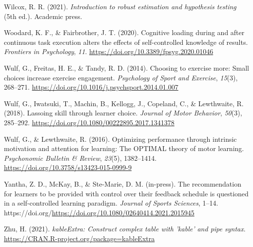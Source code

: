 \documentclass[
  doc, donotrepeattitle,floatsintext]{apa7}
\newlength{\cslhangindent}
\newlength{\cslentryspacingunit} %
\newenvironment{CSLReferences}[2] %
 {%
  \setlength{\parindent}{0pt}
  \ifodd #1
  \let\oldpar\par
  \def\par{\hangindent=\cslhangindent\oldpar}
  \fi
  \setlength{\parskip}{#2\cslentryspacingunit}
 }%
 {}
\begin{document}
\begin{CSLReferences}{1}{0}
\leavevmode{}%
Wilcox, R. R. (2021). \emph{Introduction to robust estimation and hypothesis testing} (5th ed.). Academic press.

\leavevmode{}%
Woodard, K. F., \& Fairbrother, J. T. (2020). Cognitive loading during and after continuous task execution alters the effects of self-controlled knowledge of results. \emph{Frontiers in Psychology}, \emph{11}. \url{https://doi.org/10.3389/fpsyg.2020.01046}

\leavevmode{}%
Wulf, G., Freitas, H. E., \& Tandy, R. D. (2014). Choosing to exercise more: {Small} choices increase exercise engagement. \emph{Psychology of Sport and Exercise}, \emph{15}(3), 268--271. \url{https://doi.org/10.1016/j.psychsport.2014.01.007}

\leavevmode{}%
Wulf, G., Iwatsuki, T., Machin, B., Kellogg, J., Copeland, C., \& Lewthwaite, R. (2018). Lassoing skill through learner choice. \emph{Journal of Motor Behavior}, \emph{50}(3), 285--292. \url{https://doi.org/10.1080/00222895.2017.1341378}

\leavevmode{}%
Wulf, G., \& Lewthwaite, R. (2016). Optimizing performance through intrinsic motivation and attention for learning: {The} {OPTIMAL} theory of motor learning. \emph{Psychonomic Bulletin \& Review}, \emph{23}(5), 1382--1414. \url{https://doi.org/10.3758/s13423-015-0999-9}

\leavevmode{}%
Yantha, Z. D., McKay, B., \& Ste-Marie, D. M. (in-press). The recommendation for learners to be provided with control over their feedback schedule is questioned in a self-controlled learning paradigm. \emph{Journal of Sports Sciences}, 1--14. https://doi.org/\url{https://doi.org/10.1080/02640414.2021.2015945}

\leavevmode{}%
Zhu, H. (2021). \emph{kableExtra: Construct complex table with 'kable' and pipe syntax}. \url{https://CRAN.R-project.org/package=kableExtra}

\end{CSLReferences}
\end{document}
